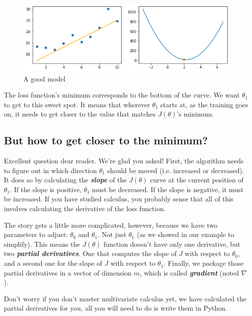 \begin{figure}[!h]
  \centering
  \includegraphics[scale=0.6]{assets/ex03_cost_3.png}
  \caption{A good model}
\end{figure}

The loss function's minimum corresponds to the bottom of the curve.
We want $\theta_1$ to get to this sweet spot.
It means that wherever $\theta_1$ starts at, as the training goes on, it needs to get closer to the value that matches $J(\theta)$'s minimum.


\subsection*{But how to get closer to the minimum?}
Excellent question dear reader.
We're glad you asked!  
First, the algorithm needs to figure out in which direction $\theta_1$ should be moved (i.e. increased or decreased).
It does so by calculating the \textbf{\textit{slope}} of the $J(\theta)$ curve at the current position of $\theta_1$.
If the slope is positive, $\theta_1$ must be decreased.
If the slope is negative, it must be increased.
If you have studied calculus, you probably sense that all of this involves calculating the derivative of the loss function.


The story gets a little more complicated, however, because we have two parameters to adjust: $\theta_0$ and $\theta_1$.
Not just $\theta_1$ (as we showed in our example to simplify).
This means the $J(\theta)$ function doesn't have only one derivative, but two \textbf{\textit{partial derivatives}}.
One that computes the slope of $J$ with respect to $\theta_0$, and a second one for the slope of $J$ with respect to $\theta_1$.
Finally, we package those partial derivatives in a vector of dimension $m$, which is called \textbf{\textit{gradient}} (noted $\nabla$).

Don't worry if you don't master multivariate calculus yet, we have calculated the partial derivatives for you, all you will need to do is write them in Python.  
